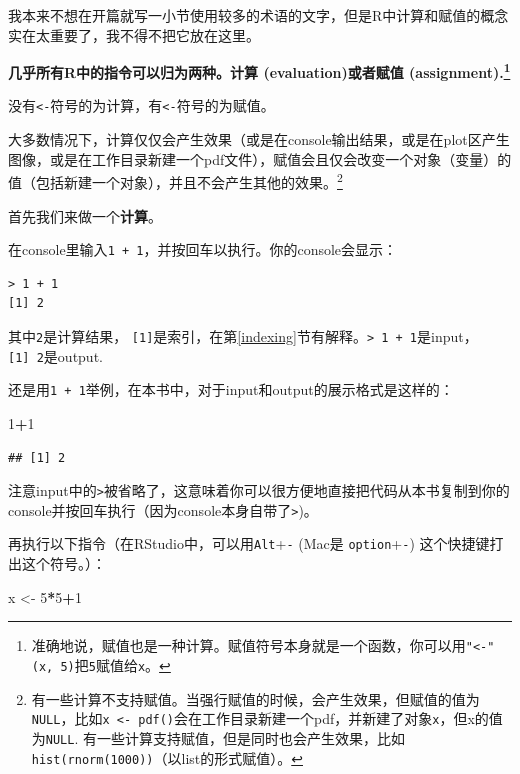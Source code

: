 \documentclass[]{book}
\newenvironment{Shaded}{\begin{snugshade}}{\end{snugshade}}
\newcommand{\DecValTok}[1]{\textcolor[rgb]{0.00,0.00,0.81}{#1}}
\newcommand{\NormalTok}[1]{#1}
\newcommand{\OperatorTok}[1]{\textcolor[rgb]{0.81,0.36,0.00}{\textbf{#1}}}
\newcommand{\StringTok}[1]{\textcolor[rgb]{0.31,0.60,0.02}{#1}}
\let\rmarkdownfootnote\footnote%
\def\footnote{\protect\rmarkdownfootnote}
\begin{document}
我本来不想在开篇就写一小节使用较多的术语的文字，但是R中计算和赋值的概念实在太重要了，我不得不把它放在这里。

\textbf{几乎所有R中的指令可以归为两种。计算 (evaluation)或者赋值 (assignment).\footnote{准确地说，赋值也是一种计算。赋值符号本身就是一个函数，你可以用\texttt{"\textless{}-"(x,\ 5)}把\texttt{5}赋值给\texttt{x}。}}

没有\texttt{\textless{}-}符号的为计算，有\texttt{\textless{}-}符号的为赋值。

大多数情况下，计算仅仅会产生效果（或是在console输出结果，或是在plot区产生图像，或是在工作目录新建一个pdf文件），赋值会且仅会改变一个对象（变量）的值（包括新建一个对象），并且不会产生其他的效果。\footnote{有一些计算不支持赋值。当强行赋值的时候，会产生效果，但赋值的值为\texttt{NULL}，比如\texttt{x\ \textless{}-\ pdf()}会在工作目录新建一个pdf，并新建了对象\texttt{x}，但x的值为\texttt{NULL}. 有一些计算支持赋值，但是同时也会产生效果，比如\texttt{hist(rnorm(1000))}（以list的形式赋值）。}

首先我们来做一个\textbf{计算}。

在console里输入\texttt{1\ +\ 1}，并按回车以执行。你的console会显示：

\begin{verbatim}
> 1 + 1
[1] 2
\end{verbatim}

其中\texttt{2}是计算结果， \texttt{{[}1{]}}是索引，在第\ref{indexing}节有解释。\texttt{\textgreater{}\ 1\ +\ 1}是input，\texttt{{[}1{]}\ 2}是output.

还是用\texttt{1\ +\ 1}举例，在本书中，对于input和output的展示格式是这样的：

\begin{Shaded}
\begin{Highlighting}[]
\DecValTok{1}\OperatorTok{+}\DecValTok{1}
\end{Highlighting}
\end{Shaded}

\begin{verbatim}
## [1] 2
\end{verbatim}

注意input中的\texttt{\textgreater{}}被省略了，这意味着你可以很方便地直接把代码从本书复制到你的console并按回车执行（因为console本身自带了\texttt{\textgreater{}})。

再执行以下指令（在RStudio中，可以用\texttt{Alt}+\texttt{-} (Mac是 \texttt{option}+\texttt{-}) 这个快捷键打出这个符号。）：

\begin{Shaded}
\begin{Highlighting}[]
\NormalTok{x <-}\StringTok{ }\DecValTok{5}\OperatorTok{*}\DecValTok{5}\OperatorTok{+}\DecValTok{1}
\end{Highlighting}
\end{Shaded}
\end{document}
